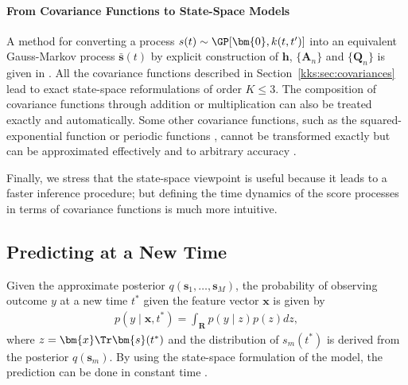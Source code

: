 \paragraph{From Covariance Functions to State-Space Models}
A method for converting a process $s(t) \sim \GP[\bm{0}, k(t, t')]$ into an equivalent Gauss-Markov process $\bar{\bm{s}}(t)$ by explicit construction of $\bm{h}$, $\{\bm{A}_n\}$ and $\{\bm{Q}_n\}$ is given in \citet{solin2016stochastic}.
All the covariance functions described in Section~\ref{kks:sec:covariances} lead to exact state-space reformulations of order $K \leq 3$.
The composition of covariance functions through addition or multiplication can also be treated exactly and automatically.
Some other covariance functions, such as the squared-exponential function or periodic functions \citep{rasmussen2006gaussian}, cannot be transformed exactly but can be approximated effectively and to arbitrary accuracy \citep{hartikainen2010kalman, solin2014explicit}.

Finally, we stress that the state-space viewpoint is useful because it leads to a faster inference procedure; but defining the time dynamics of the score processes in terms of covariance functions is much more intuitive.


\subsection{Predicting at a New Time}

Given the approximate posterior $q(\bm{s}_1, \ldots, \bm{s}_M)$, the probability of observing outcome $y$ at a new time $t^*$ given the feature vector $\bm{x}$ is given by
\begin{align*}
p(y \mid \bm{x}, t^*) = \int_\mathbf{R} p(y \mid z) p(z) dz,
\end{align*}
where $z = \bm{x}\Tr \bm{s}(t^*)$ and the distribution of $s_m(t^*)$ is derived from the posterior $q(\bm{s}_m)$.
By using the state-space formulation of the model, the prediction can be done in constant time \citep{saatci2012scalable}.
